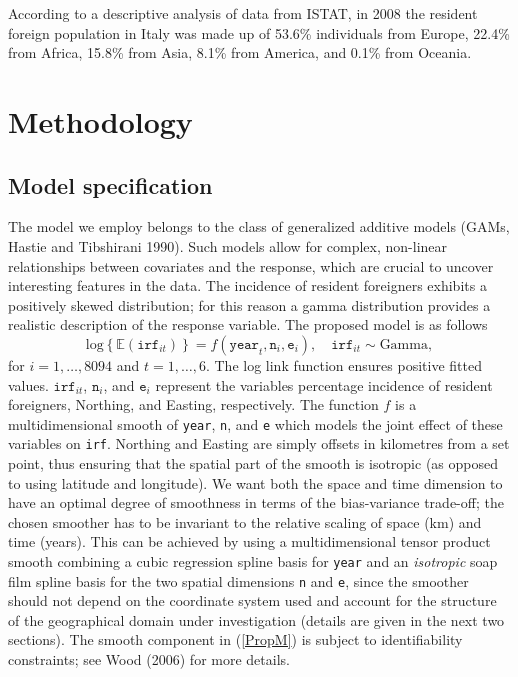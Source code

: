 \documentclass[10pt]{article}
\newcommand{\beq}{\begin{equation}}
\newcommand{\eeq}{\end{equation}}
\newcommand{\E}{\mathbb{E}}
\theoremstyle{definition}
\theoremstyle{plain}
\begin{document}
According to a descriptive analysis of data from ISTAT, in 2008 the resident foreign population in Italy was made up of 53.6\% individuals from Europe, 22.4\% from Africa, 15.8\% from Asia, 8.1\% from America, and 0.1\% from Oceania.

\section{Methodology \label{METH}}

\subsection{Model specification \label{MS}}

The model we employ belongs to the class of generalized additive models (GAMs, Hastie and Tibshirani 1990). Such models allow for complex, non-linear relationships between covariates and the response, which are crucial to uncover interesting features in the data. The incidence of resident foreigners exhibits a positively skewed distribution; for this reason a gamma distribution provides a realistic description of the response variable. The proposed model is as follows
\beq
\text{log}\left\{\E(\texttt{irf}_{it})\right\} = f(\texttt{year}_t,\texttt{n}_i,\texttt{e}_i), \quad \texttt{irf}_{it} \sim \text{Gamma},          
\label{PropM}
\eeq
for $i=1,\ldots,8094$ and $t=1,\ldots,6$. The log link function ensures positive fitted values. $\texttt{irf}_{it}$, $\texttt{n}_i$, and $\texttt{e}_i$ represent the variables percentage incidence of resident foreigners, Northing, and Easting, respectively. The function $f$ is a multidimensional smooth of \texttt{year}, \texttt{n}, and \texttt{e} which models the joint effect of these variables on \texttt{irf}. Northing and Easting are simply offsets in kilometres from a set point, thus ensuring that the spatial part of the smooth is isotropic (as opposed to using latitude and longitude). We want both the space and time dimension to have an optimal degree of smoothness in terms of the bias-variance trade-off; the chosen smoother has to be invariant to the relative scaling of space (km) and time (years). This can be achieved by using a multidimensional tensor product smooth combining a cubic regression spline basis for \texttt{year} and an \textit{isotropic} soap film spline basis for the two spatial dimensions \texttt{n} and \texttt{e}, since the smoother should not depend on the coordinate system used and account for the structure of the geographical domain under investigation (details are given in the next two sections). The smooth component in (\ref{PropM}) is subject to identifiability constraints; see Wood (2006) for more details.
\end{document}
